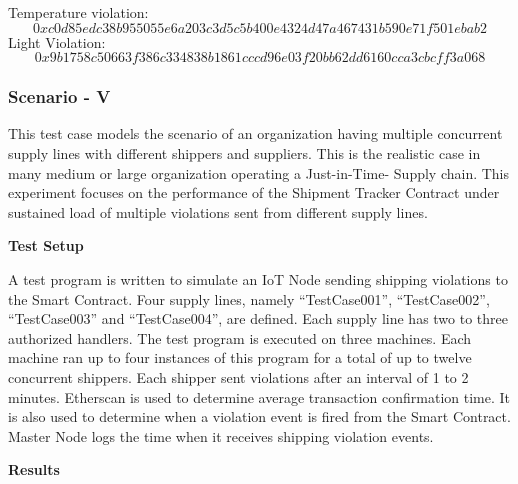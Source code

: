 Temperature violation: 
\[ 0xc0d85edc38b955055e6a203c3d5c5b400e4324d47a467431b590e71f501ebab2\]
Light Violation: \[0x9b1758c50663f386c334838b1861cccd96e03f20bb62dd6160cca3cbcff3a068\]


\subsubsection{Scenario - V} \label{viol2} 
This test case models the scenario of an organization having multiple concurrent supply lines with different shippers and suppliers. This is the realistic case in many medium or large organization operating a Just-in-Time- Supply chain. This experiment focuses on the performance of the Shipment Tracker Contract under sustained load of multiple violations sent from different supply lines. 

\textbf{Test Setup}

A test program is written to simulate an IoT Node sending shipping violations to the Smart Contract. Four supply lines, namely “TestCase001”, “TestCase002”, “TestCase003” and “TestCase004”, are defined. Each supply line has two to three authorized handlers. The test program is executed on three machines. Each machine ran up to four instances of this program for a total of up to twelve concurrent shippers. Each shipper sent violations after an interval of 1 to 2 minutes. Etherscan is used to determine average transaction confirmation time. It is also used to determine when a violation event is fired from the Smart Contract. Master Node logs the time when it receives shipping violation events.

\textbf{Results}

